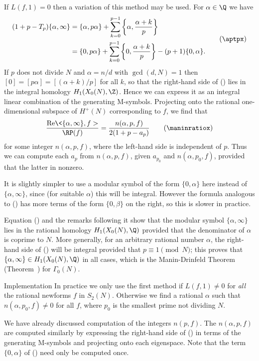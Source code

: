 If $L(f,1)=0$ then a variation of this method may be used.   For
$\alpha\in\Q$ we have  \neweq{\aptpx}
$$
  \aligned
  (1+p-T_p)\{\alpha,\infty\}
           &= \{\alpha,p\alpha\}
             + \sum_{k=0}^{p-1}\left\{\alpha,\frac{\alpha+k}{p}\right\}\\
    &= \{0,p\alpha\} + \sum_{k=0}^{p-1}\left\{0,\frac{\alpha+k}{p}\right\}
                            - (p+1)\{0,\alpha\}.
   \endaligned  \tag \aptpx
$$
If $p$ does not divide $N$ and $\alpha=n/d$ with $\gcd(d,N)=1$ then
$[0]=[p\alpha]=[(\alpha+k)/p]$ for all $k$, so that the right-hand
side of (\aptpx) lies in the integral homology $H_1(X_0(N),\Z)$.
Hence we can express it as an integral linear combination of the
generating M-symbols.  Projecting onto the rational one-dimensional
subspace of $H^+(N)$ corresponding to $f$, we find that
\neweq{\maninratiox}
$$
  \frac{\hbox{Re}\<\{\alpha,\infty\},f>}{\RP(f)}
=
  \frac{n(\alpha,p,f)}{2(1+p-a_p)}                         \tag \maninratiox
$$
for some integer $n(\alpha,p,f)$,
where the left-hand side is independent of $p$.  Thus we can compute
each $a_p$ from $n(\alpha,p,f)$, given $a_{p_0}$ and $n(\alpha,p_0,f)$,
provided that the latter in nonzero.

It is slightly simpler to use a modular symbol of the form $\{0,\alpha\}$
here instead of $\{\alpha,\infty\}$, since (for suitable $\alpha$) this
will be integral.   However the formula analogous to (\aptpx) has more terms
of the form $\{0,\beta\}$ on the right, so this is slower in practice.

Equation (\aptpx) and the remarks following it show that the modular
symbol $\{\alpha,\infty\}$ lies in the rational homology
$H_1(X_0(N),\Q)$ provided that the denominator of $\alpha$ is coprime
to $N$.  More generally, for an arbitrary rational number $\alpha$,
the right-hand side of (\aptpx) will be integral provided that
$p\equiv1\pmod{N}$;  this proves that $\{\alpha,\infty\}\in
H_1(X_0(N),\Q)$ in all cases, which is the Manin-Drinfeld Theorem
(Theorem~\ManinDrinfeld) for $\Gamma_0(N)$.
\endremark

\subhead Implementation
\endsubhead
In practice we only use the first method if $L(f,1)\not=0$ for {\it all\/}
the rational newforms $f$ in $S_2(N)$.   Otherwise we find a rational
$\alpha$ such that $n(\alpha,p_0,f)\not=0$ for all $f$, where $p_0$ is the
smallest prime not dividing $N$.

We have already discussed computation of the
integers $n(p,f)$.  The $n(\alpha,p,f)$ are computed similarly by expressing
the right-hand side of (\aptpx) in terms of the generating M-symbols and
projecting onto each eigenspace.   Note that the term $\{0,\alpha\}$ of
(\aptpx) need only be computed once.


